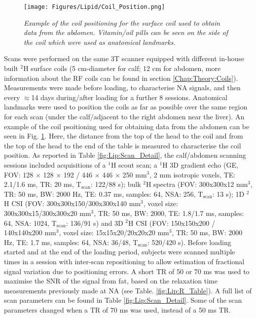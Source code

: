 \begin{figure}
    \centering
    \texttt{[image: Figures/Lipid/Coil\_Position.png]}
    \caption{\textit{Example of the coil positioning for the surface coil used to obtain data from the abdomen. Vitamin/oil pills can be seen on the side of the coil which were used as anatomical landmarks.}}
    \label{fig:Lip:Coil_Photo}
\end{figure}

Scans were performed on the same 3T scanner equipped with different in-house built $^2$H surface coils (5 cm-diameter for calf; 12 cm for abdomen, more information about the \ac{RF} coils can be found in section \ref{Chap:Theory:Coils}). Measurements were made before loading, to characterise \ac{NA} signals, and then every $\approx$14 days during/after loading for a further 8 sessions. Anatomical landmarks were used to position the coils as far as possible over the same region for each scan (under the calf/adjacent to the right abdomen near the liver). An example of the coil psoitioning used for obtaining data from the abdomen can be seen in Fig. \ref{fig:Lip:Coil_Photo}. Here, the distance from the top of the head to the coil and from the top of the head to the end of the table is measured to characterise the coil position. As reported in Table \ref{fig:Lip:Scan_Detail}, the calf/abdomen scanning sessions included acquisitions of a $^1$H scout scan; a $^1$H 3D gradient echo (\ac{GE}, \ac{FOV}: 128 $\times$ 128 $\times$ 192 / 446 $\times$ 446 $\times$ 250 mm$^3$, 2 mm isotropic voxels, \ac{TE}: 2.1/1.6 ms, TR: 20 ms, T$_\text{scan}$: 122/88 s); bulk $^2$H spectra (\ac{FOV}: 300x300x12 mm$^3$, \ac{TR}: 50 ms, \ac{BW}: 2000 Hz, \ac{TE}: 0.37 ms, samples: 64, NSA: 256, T$_\text{scan}$: 13 s); 1D $^2$H \ac{CSI} (\ac{FOV}: 300x300x150/300x300x140 mm$^3$, voxel size: 300x300x15/300x300x20 mm$^3$, \ac{TR}: 50 ms, \ac{BW}: 2000, \ac{TE}: 1.8/1.7 ms, samples: 64, NSA: 1024, T$_\text{scan}$: 136/91 s) and 3D $^2$H \ac{CSI} (\ac{FOV}: 150x150x200 / 140x140x200 mm$^3$, voxel size: 15x15x20/20x20x20 mm$^3$, TR: 50 ms, \ac{BW}: 2000 Hz, \ac{TE}: 1.7 ms, samples: 64, NSA: 36/48, T$_\text{scan}$: 520/420 s). Before loading started and at the end of the loading period, subjects were scanned multiple times in a session with inter-scan repositioning to allow estimation of fractional signal variation due to positioning errors. A short \ac{TR} of 50 or 70 ms was used to maximise the \ac{SNR} of the signal from fat, based on the relaxation time measurements previously made at \ac{NA} (see Table. \ref{fig:Lip:R_Table}). A full list of scan parameters can be found in Table \ref{fig:Lip:Scan_Detail}. Some of the scan parameters changed when a \ac{TR} of 70 ms was used, instead of a 50 ms \ac{TR}. 

